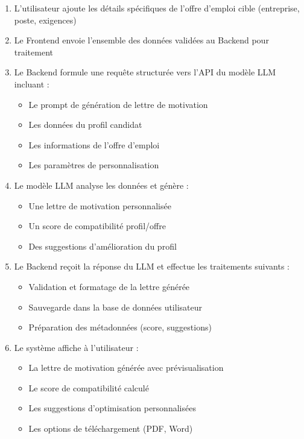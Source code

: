 \begin{enumerate}
    \item L'utilisateur ajoute les détails spécifiques de l'offre d'emploi cible (entreprise, poste, exigences)
    
    \item Le Frontend envoie l'ensemble des données validées au Backend pour traitement
    
    \item Le Backend formule une requête structurée vers l'API du modèle LLM incluant :
    \begin{itemize}
        \item Le prompt de génération de lettre de motivation
        \item Les données du profil candidat
        \item Les informations de l'offre d'emploi
        \item Les paramètres de personnalisation
    \end{itemize}
    
    \item Le modèle LLM analyse les données et génère :
    \begin{itemize}
        \item Une lettre de motivation personnalisée
        \item Un score de compatibilité profil/offre
        \item Des suggestions d'amélioration du profil
    \end{itemize}
    
    \item Le Backend reçoit la réponse du LLM et effectue les traitements suivants :
    \begin{itemize}
        \item Validation et formatage de la lettre générée
        \item Sauvegarde dans la base de données utilisateur
        \item Préparation des métadonnées (score, suggestions)
    \end{itemize}
    
    \item Le système affiche à l'utilisateur :
    \begin{itemize}
        \item La lettre de motivation générée avec prévisualisation
        \item Le score de compatibilité calculé
        \item Les suggestions d'optimisation personnalisées
        \item Les options de téléchargement (PDF, Word)
    \end{itemize}
    

\end{enumerate}
